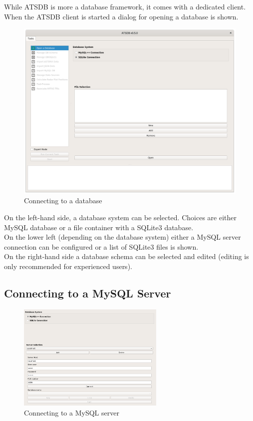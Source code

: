 While ATSDB is more a database framework, it comes with a dedicated client. When the ATSDB client is started a dialog  for opening a database is shown. 

\begin{figure}[H]
  \hspace*{-2cm}
    \includegraphics[width=18cm,frame]{../screenshots/db_config_connect.png}
  \caption{Connecting to a database}
  \label{fig:db_connect}
\end{figure}

On the left-hand side, a database system can be selected.  Choices are either MySQL database or a file container with a SQLite3 database. \\
On the lower left (depending on the database system) either a MySQL server connection can be configured or a list of SQLite3 files is shown.\\

On the right-hand side a database schema can be selected and edited (editing is only recommended for experienced users).

\subsection{Connecting to a MySQL Server}

\begin{figure}[H]
  \center
    \includegraphics[width=7cm,frame]{../screenshots/mysql_server_selection.png}
  \caption{Connecting to a MySQL server}
  \label{fig:mysql_connect}
\end{figure}

